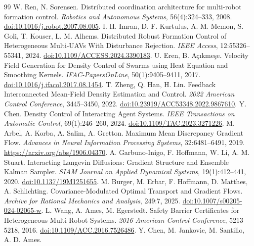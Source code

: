 \documentclass[UTF8,a4paper,11pt,fontset=none]{ctexart}
\begin{document}
\begin{thebibliography}{99}\footnotesize
\setlength{\itemsep}{2pt}\setlength{\parskip}{0pt}
 W. Ren, N. Sorensen. Distributed coordination architecture for multi-robot formation control.
\emph{Robotics and Autonomous Systems}, 56(4):324--333, 2008.
\href{https://doi.org/10.1016/j.robot.2007.08.005}{doi:10.1016/j.robot.2007.08.005}.
 I. H. Imran, D. F. Kurtulus, A. M. Memon, S. Goli, T. Kouser, L. M. Alhems.
Distributed Robust Formation Control of Heterogeneous Multi-UAVs With Disturbance Rejection.
\emph{IEEE Access}, 12:55326--55341, 2024.
\href{https://doi.org/10.1109/ACCESS.2024.3390183}{doi:10.1109/ACCESS.2024.3390183}.
 U. Eren, B. Açıkmeşe.
Velocity Field Generation for Density Control of Swarms using Heat Equation and Smoothing Kernels.
\emph{IFAC-PapersOnLine}, 50(1):9405--9411, 2017.
\href{https://doi.org/10.1016/j.ifacol.2017.08.1454}{doi:10.1016/j.ifacol.2017.08.1454}.
 T. Zheng, Q. Han, H. Lin.
Feedback Interconnected Mean-Field Density Estimation and Control.
\emph{2022 American Control Conference}, 3445--3450, 2022.
\href{https://doi.org/10.23919/ACC53348.2022.9867610}{doi:10.23919/ACC53348.2022.9867610}.
 Y. Chen. Density Control of Interacting Agent Systems.
\emph{IEEE Transactions on Automatic Control}, 69(1):246--260, 2024.
\href{https://doi.org/10.1109/TAC.2023.3271226}{doi:10.1109/TAC.2023.3271226}.
 M. Arbel, A. Korba, A. Salim, A. Gretton.
Maximum Mean Discrepancy Gradient Flow.
\emph{Advances in Neural Information Processing Systems}, 32:6481--6491, 2019.
\url{https://arxiv.org/abs/1906.04370}.
 A. Garbuno-Inigo, F. Hoffmann, W. Li, A. M. Stuart.
Interacting Langevin Diffusions: Gradient Structure and Ensemble Kalman Sampler.
\emph{SIAM Journal on Applied Dynamical Systems}, 19(1):412--441, 2020.
\href{https://doi.org/10.1137/19M1251655}{doi:10.1137/19M1251655}.
 M. Burger, M. Erbar, F. Hoffmann, D. Matthes, A. Schlichting.
Covariance-Modulated Optimal Transport and Gradient Flows.
\emph{Archive for Rational Mechanics and Analysis}, 249:7, 2025.
\href{https://doi.org/10.1007/s00205-024-02065-w}{doi:10.1007/s00205-024-02065-w}.
 L. Wang, A. Ames, M. Egerstedt.
Safety Barrier Certificates for Heterogeneous Multi-Robot Systems.
\emph{2016 American Control Conference}, 5213--5218, 2016.
\href{https://doi.org/10.1109/ACC.2016.7526486}{doi:10.1109/ACC.2016.7526486}.
 Y. Chen, M. Jankovic, M. Santillo, A. D. Ames.

\end{thebibliography}
\end{document}
